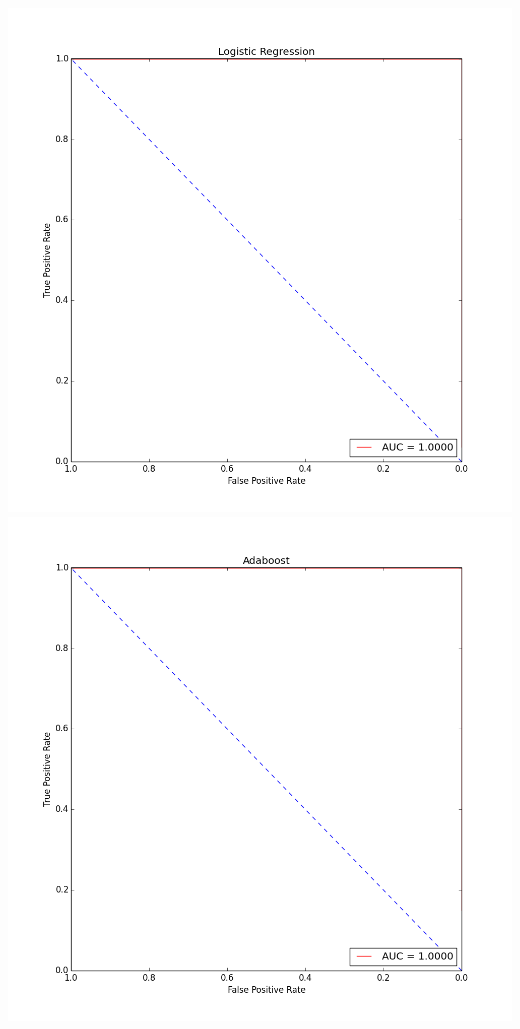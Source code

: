 \documentclass[fleqn]{article}
\begin{document}
    \begin{center}
        \includegraphics[scale=0.2]{roc_LR.png}
        \includegraphics[scale=0.2]{roc_AdaBoost.png}
    \end{center}
\end{document}
